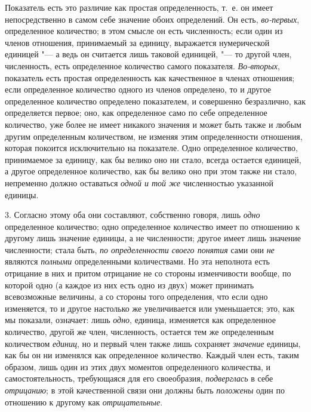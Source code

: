 Показатель есть это различие как простая определенность, т.~е. он имеет
непосредственно в самом себе значение обоих определений. Он есть,
{\em во-первых}, определенное количество; в этом смысле
он есть численность; если один из членов отношения, принимаемый за единицу,
выражается нумерической единицей "--- а ведь он считается лишь таковой
единицей, "--- то другой член, численность, есть определенное количество
самого показателя. {\em Во-вторых}, показатель есть
простая определенность как качественное в членах отношения; если
определенное количество одного из членов определено, то и другое
определенное количество определено показателем, и совершенно безразлично,
как определяется первое; оно, как определенное само по себе определенное
количество, уже более не имеет никакого значения и может быть также и любым
другим определенным количеством, не изменяя этим определенности отношения,
которая покоится исключительно на показателе. Одно определенное количество,
принимаемое за единицу, как бы велико оно ни стало, всегда остается
единицей, а другое определенное количество, как бы велико оно при этом
также ни стало, непременно должно оставаться {\em одной
и той же} численностью указанной единицы.

3. Согласно этому оба они составляют, собственно говоря, лишь
{\em одно} определенное количество; одно определенное
количество имеет по отношению к другому лишь значение единицы, а не
численности; другое имеет лишь значение численности; стала быть,
{\em по определенности своего понятия} сами они
{\em не} являются {\em полными}
определенными количествами. Но эта неполнота есть отрицание в них и притом
отрицание не со стороны изменчивости вообще, по которой одно (а каждое из
них есть одно из двух) может принимать всевозможные величины, а со стороны
того определения, что если одно изменяется, то и другое настолько же
увеличивается или уменьшается; это, как мы показали, означает: лишь
{\em одно}, единица, изменяется как определенное
количество, другой же член, численность, остается тем же определенным
количеством {\em единиц}, но и первый член также лишь
сохраняет {\em значение} единицы, как бы он ни
изменялся как определенное количество. Каждый член есть, таким образом,
лишь один из этих двух моментов определенного количества, и
самостоятельность, требующаяся для его своеобразия,
{\em подверглась} в себе
{\em отрицанию}; в этой качественной связи они должны
быть {\em положены} один по отношению к другому как
{\em отрицательные}.

